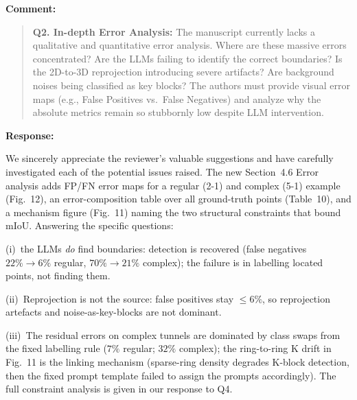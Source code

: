 \documentclass[11pt,a4paper]{article}
\newcommand{\MSErrorCompositionTable}{Table~10}
\newcommand{\MSErrorMechanismFigure}{Fig.~11}
\newcommand{\MSErrorMapFigure}{Fig.~12}
\newenvironment{commentblock}{%
  \par\smallskip\noindent\textbf{Comment:}\par
  \begin{quote}\itshape\color{black}
}{%
  \end{quote}\smallskip
}
\newenvironment{responseblock}{%
  \par\smallskip\noindent\textbf{Response:}\par
  \begingroup\color{responsegreen}
}{%
  \endgroup\smallskip
}
\begin{document}
\begin{commentblock}
\textbf{Q2. In-depth Error Analysis:} The manuscript currently lacks a qualitative and quantitative error analysis. Where are these massive errors concentrated? Are the LLMs failing to identify the correct boundaries? Is the 2D-to-3D reprojection introducing severe artifacts? Are background noises being classified as key blocks? The authors must provide visual error maps (e.g., False Positives vs.\ False Negatives) and analyze why the absolute metrics remain so stubbornly low despite LLM intervention.
\end{commentblock}
\begin{responseblock}
We sincerely appreciate the reviewer’s valuable suggestions and have carefully investigated each of the potential issues raised. The new Section~4.6 Error analysis adds FP/FN error maps for a regular (2-1) and complex (5-1) example (\MSErrorMapFigure), an error-composition table over all ground-truth points (\MSErrorCompositionTable), and a mechanism figure (\MSErrorMechanismFigure) naming the two structural constraints that bound mIoU. Answering the specific questions: 

(i)~the LLMs \emph{do} find boundaries: detection is recovered (false negatives $22\% \rightarrow 6\%$ regular, $70\% \rightarrow 21\%$ complex); the failure is in labelling located points, not finding them. 

(ii)~Reprojection is not the source: false positives stay $\leq 6\%$, so reprojection artefacts and noise-as-key-blocks are not dominant. 

(iii)~The residual errors on complex tunnels are dominated by class swaps from the fixed labelling rule ($7\%$ regular; $32\%$ complex); the ring-to-ring K drift in \MSErrorMechanismFigure{} is the linking mechanism (sparse-ring density degrades K-block detection, then the fixed prompt template failed to assign the prompts accordingly). The full constraint analysis is given in our response to Q4.
\end{responseblock}
\end{document}
